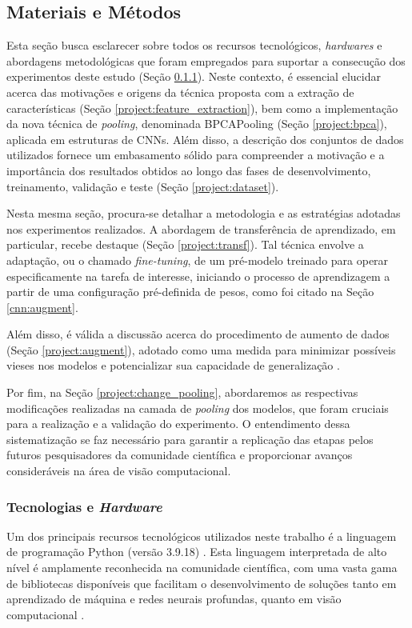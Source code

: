 \subsection{Materiais e Métodos}
\label{project:matmet}
Esta seção busca esclarecer sobre todos os recursos tecnológicos, \textit{hardwares} e abordagens metodológicas que foram empregados para suportar a consecução dos experimentos deste estudo (Seção \ref{project:techard}). Neste contexto, é essencial elucidar acerca das motivações e origens da técnica proposta com a extração de características (Seção \ref{project:feature_extraction}), bem como a implementação da nova técnica de \textit{pooling}, denominada BPCAPooling (Seção \ref{project:bpca}), aplicada em estruturas de CNNs. Além disso, a descrição dos conjuntos de dados utilizados fornece um embasamento sólido para compreender a motivação e a importância dos resultados obtidos ao longo das fases de desenvolvimento, treinamento, validação e teste (Seção \ref{project:dataset}).

Nesta mesma seção, procura-se detalhar a metodologia e as estratégias adotadas nos experimentos realizados. A abordagem de transferência de aprendizado, em particular, recebe destaque (Seção \ref{project:transf}). Tal técnica envolve a adaptação, ou o chamado \textit{fine-tuning}, de um pré-modelo treinado para operar especificamente na tarefa de interesse, iniciando o processo de aprendizagem a partir de uma configuração pré-definida de pesos, como foi citado na Seção \ref{cnn:augment}.

Além disso, é válida a discussão acerca do procedimento de aumento de dados (Seção \ref{project:augment}), adotado como uma medida para minimizar possíveis vieses nos modelos e potencializar sua capacidade de generalização \citep{Shorten2019ALearning}.

Por fim, na Seção \ref{project:change_pooling}, abordaremos as respectivas modificações realizadas na camada de \textit{pooling} dos modelos, que foram cruciais para a realização e a validação do experimento. O entendimento dessa sistematização se faz necessário para garantir a replicação das etapas pelos futuros pesquisadores da comunidade científica e proporcionar avanços consideráveis na área de visão computacional.

\subsubsection{Tecnologias e \textit{Hardware}}
\label{project:techard}
Um dos principais recursos tecnológicos utilizados neste trabalho é a linguagem de programação Python (versão 3.9.18) \citep{VanRossum2009PythonManual}. Esta linguagem interpretada de alto nível é amplamente reconhecida na comunidade científica, com uma vasta gama de bibliotecas disponíveis que facilitam o desenvolvimento de soluções tanto em aprendizado de máquina e redes neurais profundas, quanto em visão computacional \citep{Millman2011PythonEngineers, Perkel2015Programming:Python}.

